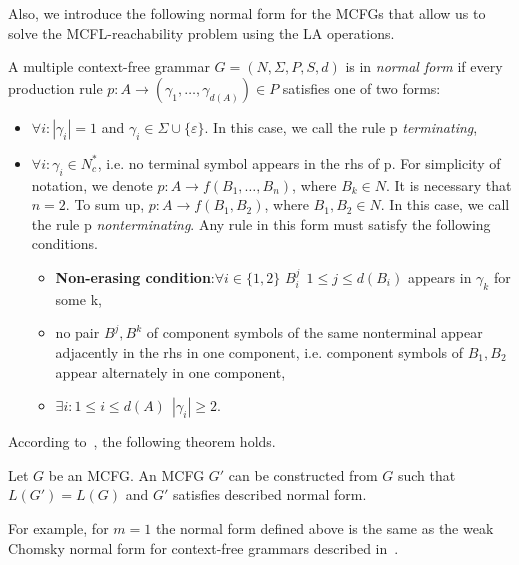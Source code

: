 Also, we introduce the following normal form for the MCFGs that allow us to solve the MCFL-reachability problem using the LA operations.

\begin{definition} A multiple context-free grammar $G = (N, \Sigma, P, S, d)$ is in \emph{normal form} if every production rule $p: A \rightarrow (\gamma_1, \dots, \gamma_{d(A)}) \in P$ satisfies one of two forms:
    \begin{itemize}
            \item $\forall i: |\gamma_i| = 1$ and $\gamma_i \in \Sigma \cup \{\varepsilon\}$. In this case, we call the rule p \textit{terminating},
            \item $\forall i: \gamma_i \in N_c^*$, i.e. no terminal symbol appears in the rhs of p. For simplicity of notation, we denote $p: A \rightarrow f(B_1, \dots, B_n)$, where $B_k \in N$. It is necessary that $n = 2$. To sum up, $p: A \rightarrow f(B_1, B_2)$, where $B_1, B_2 \in N$. In this case, we call the rule p \textit{nonterminating}. Any rule in this form must satisfy the following conditions.
            \begin{itemize}
                \item \textbf{Non-erasing condition}:$\forall i \in \{1,2\}$ $B_i^j \ \ 1 \leq j \leq d(B_i)$ appears in $\gamma_k$ for some k,
                \item no pair $B^j, B^k$ of component symbols of the same nonterminal appear adjacently in the rhs in one component, i.e. component symbols of $B_1, B_2$ appear alternately in one component,
                \item $\exists i: 1 \leq i \leq d(A) \ \ |\gamma_i| \geq 2$.
            \end{itemize}
        \end{itemize}
\end{definition}

According to~\cite{nakanishi1997efficient}, the following theorem holds.

\begin{mytheorem}\label{thm:formofmcfg}
Let $G$ be an MCFG. An MCFG $G'$ can be constructed from $G$ such that $L(G') = L(G)$ and $G'$ satisfies described normal form.
\end{mytheorem}

For example, for $m = 1$ the normal form defined above is the same as the weak Chomsky normal form for context-free grammars described in~\cite{azimov2021context}.

